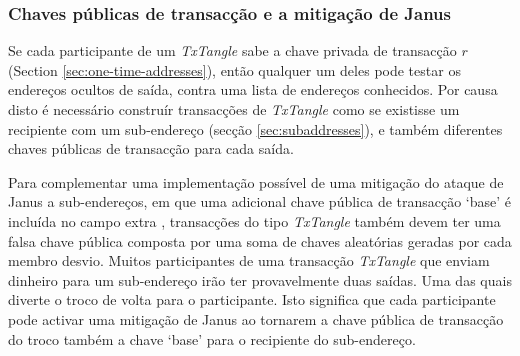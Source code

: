 \subsubsection*{Chaves públicas de transacção e a mitigação de Janus}

Se cada participante de um {\em TxTangle} sabe a chave privada de transacção $r$ (Section \ref{sec:one-time-addresses}), então qualquer um deles pode testar os endereços ocultos de saída, contra uma lista de endereços conhecidos. Por causa disto é necessário construír transacções de {\em TxTangle} como se existisse um recipiente com um sub-endereço (secção \ref{sec:subaddresses}), e também diferentes chaves públicas de transacção para cada saída.

Para complementar uma implementação possível de uma mitigação do ataque de Janus a sub-endereços, em que uma adicional chave pública de transacção `base' é incluída no campo extra \cite{janus-mitigation-issue-62}, transacções do tipo {\em TxTangle} também devem ter uma falsa chave pública composta por uma soma de chaves aleatórias geradas por cada membro desvio. Muitos participantes de uma transacção {\em TxTangle} que enviam dinheiro para um sub-endereço irão ter provavelmente duas saídas. Uma das quais diverte o troco de volta para o participante. Isto significa que cada participante pode activar uma mitigação de Janus ao tornarem a chave pública de transacção do troco também a chave `base' para o recipiente do sub-endereço.    


